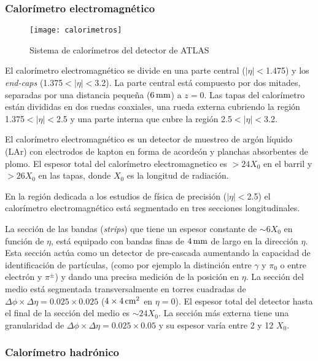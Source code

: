 \subsubsection{Calorímetro electromagnético}

\begin{figure}[!p]
  \centering

  \texttt{[image: calorimetros]}

  \caption{Sistema de calorímetros del detector de ATLAS}
  \label{fig:calorimetros}

\end{figure}

El calorímetro electromagnético \cite{caloemTDR} se divide en una parte central
($|\eta|<$1.475) y los \emph{end-caps} (1.375$<|\eta|<$3.2). La parte central
está compuesto por dos mitades, separadas por una
distancia pequeña ($\unit[6]{mm}$) a $z = 0$. Las tapas del calorímetro están divididas en
dos ruedas coaxiales, una rueda externa cubriendo la región 1.375$<|\eta|<$2.5 y
una parte interna que cubre la región 2.5$<|\eta|<$3.2.

El calorímetro electromagnético es un detector de muestreo de argón líquido
(LAr) con electrodos de kapton en forma de acordeón y planchas absorbentes de
plomo. El espesor total del calorímetro electromagnetico es $>24 X_0$ en el
barril y $>26 X_0$ en las tapas, donde $X_0$ es la longitud de radiación.

En la región dedicada a los estudios de física de precisión ($|\eta|<$2.5) el
calorímetro electromagnético está segmentado en tres secciones longitudinales.

La sección de las bandas (\emph{strips}) que tiene un espesor constante de
$\sim 6 X_0$ en función de $\eta$, está equipado con bandas finas de $\unit[4]{mm}$ de
largo en la dirección $\eta$. Esta sección actúa como un detector de pre-cascada
aumentando la capacidad de identificación de partículas,
(como por ejemplo la distinción entre $\gamma$ y $\pi_0$ o entre electrón y
$\pi^\pm$) y dando una precisa medición de la posición en $\eta$.
La sección del medio está segmentada transversalmente en torres cuadradas de
$\Delta \phi \times \Delta \eta = 0.025 \times 0.025$ ($4 \times \unit[4]{cm^2}$ en
$\eta=0$). El espesor total del detector hasta el final de la sección del medio
es $\sim 24 X_0$.
La sección más externa tiene una granularidad de
$\Delta\phi\times\Delta\eta = 0.025 \times 0.05$ y su espesor varía entre 2 y 12
$X_0$.


\subsubsection{Calorímetro hadrónico}

